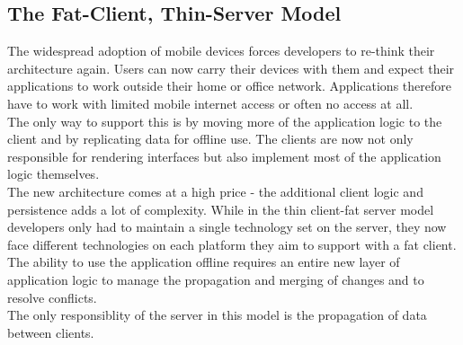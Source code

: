 \subsection{The Fat-Client, Thin-Server Model}
The widespread adoption of mobile devices forces developers to re-think their architecture again.
Users can now carry their devices with them and expect their applications to work outside their home or office network.
Applications therefore have to work with limited mobile internet access or often no access at all.\\
The only way to support this is by moving more of the application logic to the client and by replicating data for offline use.
The clients are now not only responsible for rendering interfaces but also implement most of the application logic themselves.\\
The new architecture comes at a high price - the additional client logic and persistence adds a lot of complexity.
While in the thin client-fat server model developers only had to maintain a single technology set on the server, they now face different technologies on each platform they aim to support with a fat client.\\
The ability to use the application offline requires an entire new layer of application logic to manage the propagation and merging of changes and to resolve conflicts.\\
The only responsiblity of the server in this model is the propagation of data between clients.


